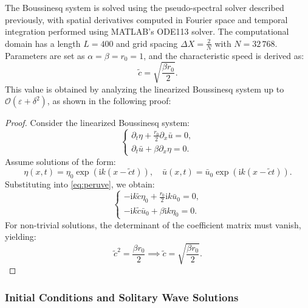 \documentclass[alpha-refs, 12pt]{wiley-article}
\renewcommand{\O}{\mathcal{O}}
\newcommand{\ui}{\mathrm{i}}
\newcommand{\eps}{\varepsilon}
\begin{document}
The Boussinesq system is solved using the pseudo-spectral solver described previously, with spatial derivatives computed in Fourier space and temporal integration performed using MATLAB's ODE113 solver. The computational domain has a length $L = 400$ and grid spacing $\Delta X = \frac{2}{N}$ with $N = 32\,768$. Parameters are set as $\alpha = \beta = r_0 = 1$, and the characteristic speed is derived as:
\[
  \tilde{c} = \sqrt{\dfrac{\beta r_0}{2}}.
\]
This value is obtained by analyzing the linearized Boussinesq system up to $\O(\eps + \delta^2)$, as shown in the following proof:
\begin{proof}
  Consider the linearized Boussinesq system:
  \begin{equation}\label{eq:peruve}
  \begin{cases}
  \partial_t \eta + \frac{r_0}{2} \partial_x \bar{u} = 0, \\
  \partial_t \bar{u} + \beta \partial_x \eta = 0.
  \end{cases}
  \end{equation}
  Assume solutions of the form:
  \[
  \eta(x,t) = \eta_0 \exp(\ui k (x - \tilde{c} t)), \quad \bar{u}(x,t) = \bar{u}_0 \exp(\ui k (x - \tilde{c} t)).
  \]
  Substituting into \eqref{eq:peruve}, we obtain:
  \[
  \begin{cases}
  -\ui k \tilde{c} \eta_0 + \frac{r_0}{2} \ui k \bar{u}_0 = 0, \\
  -\ui k \tilde{c} \bar{u}_0 + \beta \ui k \eta_0 = 0.
  \end{cases}
  \]
  For non-trivial solutions, the determinant of the coefficient matrix must vanish, yielding:
  \[
  \tilde{c}^2 = \frac{\beta r_0}{2} \implies \tilde{c} = \sqrt{\frac{\beta r_0}{2}}.
  \]
\end{proof}

\subsubsection{Initial Conditions and Solitary Wave Solutions}
\end{document}
